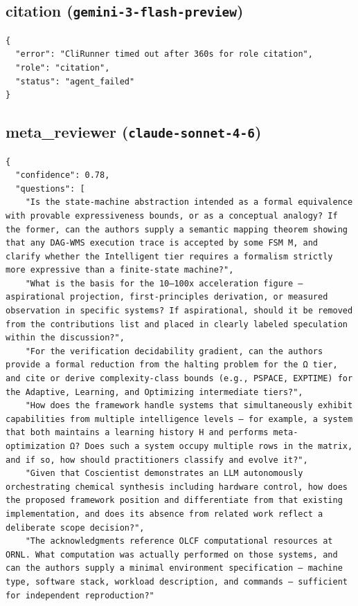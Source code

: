 \documentclass[11pt]{article}
\begin{document}
\subsection*{citation (\texttt{gemini-3-flash-preview})}
\begin{verbatim}
{
  "error": "CliRunner timed out after 360s for role citation",
  "role": "citation",
  "status": "agent_failed"
}
\end{verbatim}

\subsection*{meta_reviewer (\texttt{claude-sonnet-4-6})}
\begin{verbatim}
{
  "confidence": 0.78,
  "questions": [
    "Is the state-machine abstraction intended as a formal equivalence with provable expressiveness bounds, or as a conceptual analogy? If the former, can the authors supply a semantic mapping theorem showing that any DAG-WMS execution trace is accepted by some FSM M, and clarify whether the Intelligent tier requires a formalism strictly more expressive than a finite-state machine?",
    "What is the basis for the 10–100x acceleration figure — aspirational projection, first-principles derivation, or measured observation in specific systems? If aspirational, should it be removed from the contributions list and placed in clearly labeled speculation within the discussion?",
    "For the verification decidability gradient, can the authors provide a formal reduction from the halting problem for the Ω tier, and cite or derive complexity-class bounds (e.g., PSPACE, EXPTIME) for the Adaptive, Learning, and Optimizing intermediate tiers?",
    "How does the framework handle systems that simultaneously exhibit capabilities from multiple intelligence levels — for example, a system that both maintains a learning history H and performs meta-optimization Ω? Does such a system occupy multiple rows in the matrix, and if so, how should practitioners classify and evolve it?",
    "Given that Coscientist demonstrates an LLM autonomously orchestrating chemical synthesis including hardware control, how does the proposed framework position and differentiate from that existing implementation, and does its absence from related work reflect a deliberate scope decision?",
    "The acknowledgments reference OLCF computational resources at ORNL. What computation was actually performed on those systems, and can the authors supply a minimal environment specification — machine type, software stack, workload description, and commands — sufficient for independent reproduction?"

\end{verbatim}
\end{document}
